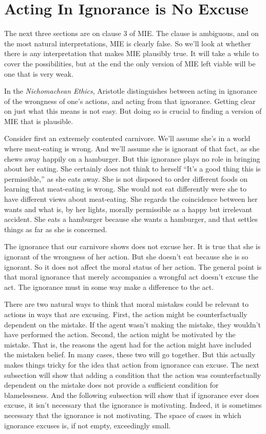 \section{Acting In Ignorance is No Excuse}
\label{actinginignoranceisnoexcuse}

The next three sections are on clause 3 of MIE. The clause is ambiguous, and on the most natural interpretations, MIE is clearly false. So we'll look at whether there is any interpretation that makes MIE plausibly true. It will take a while to cover the possibilities, but at the end the only version of MIE left viable will be one that is very weak.

In the \emph{Nichomachean Ethics}, Aristotle distinguishes between acting in ignorance of the wrongness of one's actions, and acting from that ignorance. Getting clear on just what this means is not easy. But doing so is crucial to finding a version of MIE that is plausible.

Consider first an extremely contented carnivore. We'll assume she's in a world where meat-eating is wrong. And we'll assume she is ignorant of that fact, as she chews away happily on a hamburger. But this ignorance plays no role in bringing about her eating. She certainly does not think to herself ``It's a good thing this is permissible,'' as she eats away. She is not disposed to order different foods on learning that meat-eating is wrong. She would not eat differently were she to have different views about meat-eating. She regards the coincidence between her wants and what is, by her lights, morally permissible as a happy but irrelevant accident. She eats a hamburger because she wants a hamburger, and that settles things as far as she is concerned.

The ignorance that our carnivore shows does not excuse her. It is true that she is ignorant of the wrongness of her action. But she doesn't eat because she is so ignorant. So it does not affect the moral status of her action. The general point is that moral ignorance that merely accompanies a wrongful act doesn't excuse the act. The ignorance must in some way make a difference to the act.

There are two natural ways to think that moral mistakes could be relevant to actions in ways that are excusing. First, the action might be counterfactually dependent on the mistake. If the agent wasn't making the mistake, they wouldn't have performed the action. Second, the action might be motivated by the mistake. That is, the reasons the agent had for the action might have included the mistaken belief. In many cases, these two will go together. But this actually makes things tricky for the idea that action from ignorance can excuse. The next subsection will show that adding a condition that the action was counterfactually dependent on the mistake does not provide a sufficient condition for blamelessness. And the following subsection will show that if ignorance ever does excuse, it isn't necessary that the ignorance is motivating. Indeed, it is sometimes necessary that the ignorance is not motivating. The space of cases in which ignorance excuses is, if not empty, exceedingly small.


